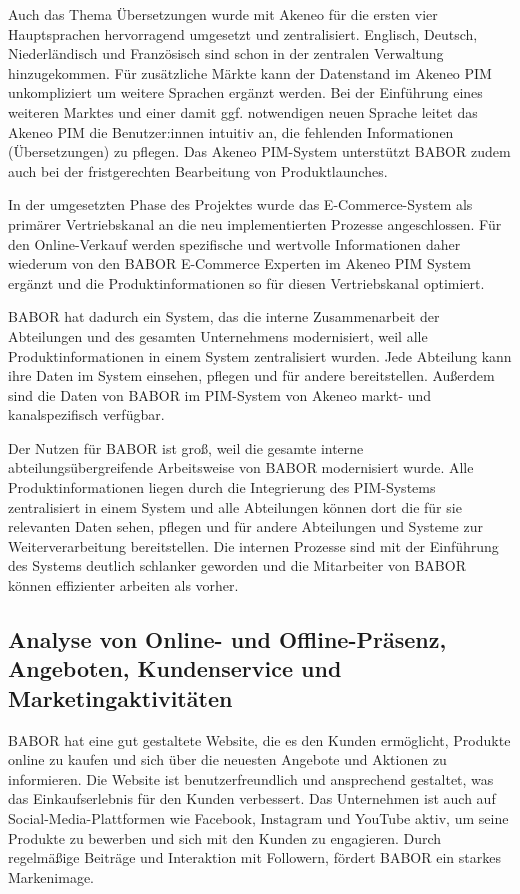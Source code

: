 Auch das Thema Übersetzungen wurde mit Akeneo für die ersten vier Hauptsprachen hervorragend umgesetzt und zentralisiert. Englisch, Deutsch, Niederländisch und Französisch sind schon in der zentralen Verwaltung hinzugekommen. Für zusätzliche Märkte kann der Datenstand im Akeneo PIM unkompliziert um weitere Sprachen ergänzt werden. Bei der Einführung eines weiteren Marktes und einer damit ggf. notwendigen neuen Sprache leitet das Akeneo PIM die Benutzer:innen intuitiv an, die fehlenden Informationen (Übersetzungen) zu pflegen. Das Akeneo PIM-System unterstützt BABOR zudem auch bei der fristgerechten Bearbeitung von Produktlaunches.
\newline

In der umgesetzten Phase des Projektes wurde das E-Commerce-System als primärer Vertriebskanal an die neu implementierten Prozesse angeschlossen. Für den Online-Verkauf werden spezifische und wertvolle Informationen daher wiederum von den BABOR E-Commerce Experten im Akeneo PIM System ergänzt und die Produktinformationen so für diesen Vertriebskanal optimiert.
\newline

BABOR hat dadurch ein System, das die interne Zusammenarbeit der Abteilungen und des gesamten Unternehmens modernisiert, weil alle Produktinformationen in einem System zentralisiert wurden. Jede Abteilung kann ihre Daten im System einsehen, pflegen und für andere bereitstellen. Außerdem sind die Daten von BABOR im PIM-System von Akeneo markt- und kanalspezifisch verfügbar.
\newline

Der Nutzen für BABOR ist groß, weil die gesamte interne abteilungsübergreifende Arbeitsweise von BABOR modernisiert wurde. Alle Produktinformationen liegen durch die Integrierung des PIM-Systems zentralisiert in einem System und alle Abteilungen können dort die für sie relevanten Daten sehen, pflegen und für andere Abteilungen und Systeme zur Weiterverarbeitung bereitstellen. Die internen Prozesse sind mit der Einführung des Systems deutlich schlanker geworden und die Mitarbeiter von BABOR können effizienter arbeiten als vorher.


\subsection{Analyse von Online- und Offline-Präsenz, Angeboten, Kundenservice und Marketingaktivitäten}\label{unterabschnitt_4_5}
BABOR hat eine gut gestaltete Website, die es den Kunden ermöglicht, Produkte online zu kaufen und sich über die neuesten Angebote und Aktionen zu informieren. Die Website ist benutzerfreundlich und ansprechend gestaltet, was das Einkaufserlebnis für den Kunden verbessert. Das Unternehmen ist auch auf Social-Media-Plattformen wie Facebook, Instagram und YouTube aktiv, um seine Produkte zu bewerben und sich mit den Kunden zu engagieren. Durch regelmäßige Beiträge und Interaktion mit Followern, fördert BABOR ein starkes Markenimage.
\newline

